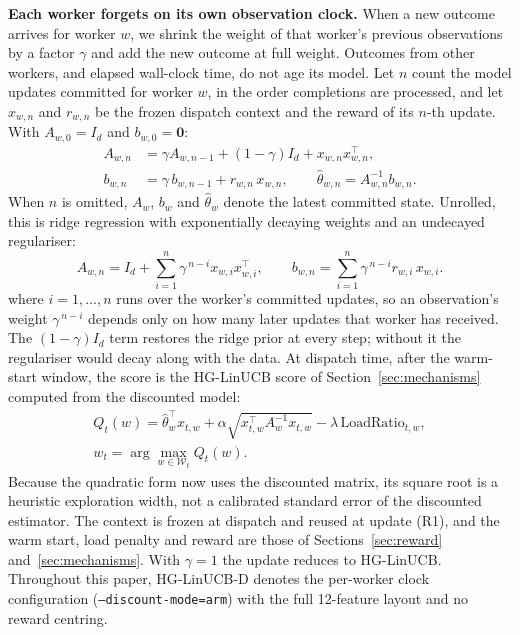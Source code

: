\documentclass[final,5p,times,twocolumn]{elsarticle}
\begin{document}
\textbf{Each worker forgets on its own observation clock.} When a new outcome arrives for worker $w$, we shrink the weight of that worker's previous observations by a factor $\gamma$ and add the new outcome at full weight. Outcomes from other workers, and elapsed wall-clock time, do not age its model. Let $n$ count the model updates committed for worker $w$, in the order completions are processed, and let $x_{w,n}$ and $r_{w,n}$ be the frozen dispatch context and the reward of its $n$-th update. With $A_{w,0}=I_d$ and $b_{w,0}=\mathbf{0}$:
\begin{align}
A_{w,n}&=\gamma A_{w,n-1}+(1-\gamma)I_d+x_{w,n}x_{w,n}^\top,\\
b_{w,n}&=\gamma\,b_{w,n-1}+r_{w,n}\,x_{w,n},\qquad \hat\theta_{w,n}=A_{w,n}^{-1}b_{w,n}.
\end{align}
When $n$ is omitted, $A_w$, $b_w$ and $\hat\theta_w$ denote the latest committed state. Unrolled, this is ridge regression with exponentially decaying weights and an undecayed regulariser:
\begin{equation}
A_{w,n}=I_d+\sum_{i=1}^{n}\gamma^{\,n-i}x_{w,i}x_{w,i}^\top,\qquad b_{w,n}=\sum_{i=1}^{n}\gamma^{\,n-i}r_{w,i}\,x_{w,i}.
\end{equation}
where $i=1,\dots,n$ runs over the worker's committed updates, so an observation's weight $\gamma^{\,n-i}$ depends only on how many later updates that worker has received. The $(1-\gamma)I_d$ term restores the ridge prior at every step; without it the regulariser would decay along with the data. At dispatch time, after the warm-start window, the score is the HG-LinUCB score of Section~\ref{sec:mechanisms} computed from the discounted model:
\begin{equation}
\begin{gathered}
Q_t(w)=\hat\theta_w^\top x_{t,w}+\alpha\sqrt{x_{t,w}^\top A_w^{-1}x_{t,w}}-\lambda\,\text{LoadRatio}_{t,w},\\
w_t=\arg\max_{w\in\mathcal{W}_t}Q_t(w).
\end{gathered}
\end{equation}
Because the quadratic form now uses the discounted matrix, its square root is a heuristic exploration width, not a calibrated standard error of the discounted estimator. The context is frozen at dispatch and reused at update (R1), and the warm start, load penalty and reward are those of Sections~\ref{sec:reward} and~\ref{sec:mechanisms}. With $\gamma=1$ the update reduces to HG-LinUCB. Throughout this paper, HG-LinUCB-D denotes the per-worker clock configuration (\texttt{--discount-mode=arm}) with the full 12-feature layout and no reward centring.
\end{document}
